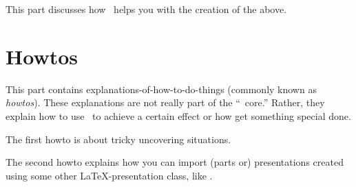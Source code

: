 \documentclass{ltxdoc}
\begin{document}
This part discusses how \beamer\ helps you with the creation of the above.








\part{Howtos}

This part contains explanations-of-how-to-do-things (commonly known as \emph{howtos}). These explanations are not really part of the ``\beamer\ core.'' Rather, they explain how to use \beamer\ to achieve a certain effect or how get something special done.

The first howto is about tricky uncovering situations.

The second howto explains how you can import (parts or) presentations created using some other \LaTeX-presentation class, like \prosper.




\printindex
\end{document}
